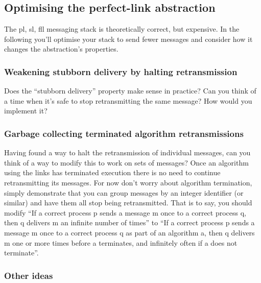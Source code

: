 \documentclass[a4paper]{article}
\begin{document}

\subsection{Optimising the perfect-link abstraction} %
\label{sub:optimising_pl}

The pl, sl, fll messaging stack is theoretically correct, but expensive.
In the following you'll optimise your stack to send fewer
messages and consider how it changes the abstraction's properties.

\subsubsection{Weakening stubborn delivery by halting retransmission} %
\label{ssub:weakening_stubborn_delivery_by_halting_retransmission}

Does the ``stubborn delivery'' property make sense in practice? Can you think
of a time when it's safe to stop retransmitting the same message? How would
you implement it?


\subsubsection{Garbage collecting terminated algorithm retransmissions} %
\label{ssub:halting_retransmission_on_algorithm_termination}

Having found a way to halt the retransmission of individual messages, can you
think of a way to modify this to work on sets of messages? Once an algorithm
using the links has terminated execution there is no need to continue
retransmitting its messages. For now don't worry about algorithm termination,
simply demonstrate that you can group messages by an integer identifier (or
similar) and have them all stop being retransmitted. That is to say, you
should modify ``If a correct process p sends a message m once to a correct
process q, then q delivers m an infinite number of times'' to ``If a correct
process p sends a message m once to a correct process q as part of an
algorithm a, then q delivers m one or more times before a terminates, and
infinitely often if a does not terminate''.


\subsubsection{Other ideas} %
\label{ssub:other_ideas}
\end{document}
